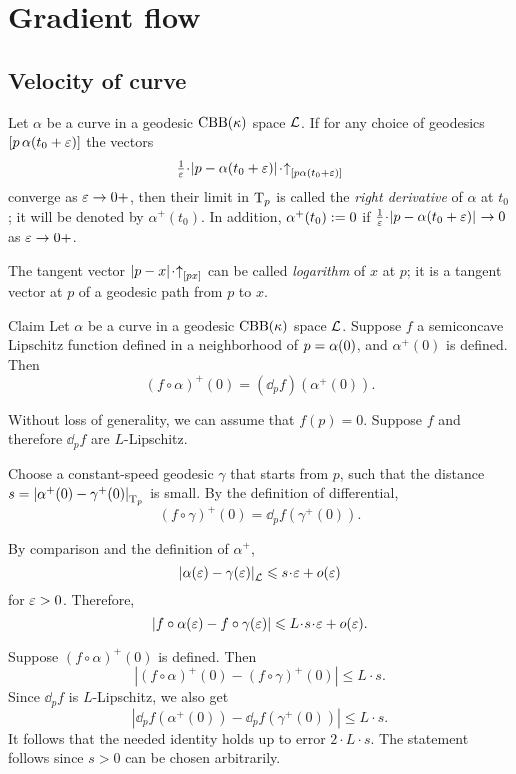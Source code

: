 \chapter{Gradient flow}\label{chap:GF}

\section{Velocity of curve}

Let $\alpha$ be a curve in a geodesic $\mathrm{CBB}(\kappa)$ space $\mathcal{L}$.
If for any choice of 
geodesics $[p\,\alpha(t_0+\varepsilon)]$ the vectors 
\[\tfrac{1}{\eps}\cdot\dist{p}{\alpha(t_0+\eps)}{}\cdot\dir p{\alpha(t_0+\eps)}\]
converge as $\varepsilon\to 0+$, then their limit in $\mathrm{T}_p$ is called the \emph{right derivative} of $\alpha$ at $t_0$; it will be denoted by $\alpha^+(t_0)$.
In addition, $\alpha^+(t_0)\mathrel{:=}0$
if $\tfrac{1}{\eps}\cdot\dist{p}{\alpha(t_0+\eps)}{}\to 0$ as $\varepsilon\to 0+$.

The tangent vector $\dist px{}\cdot\dir px$ can be called \emph{logarithm} of $x$ at $p$;
it is a tangent vector at $p$ of a geodesic path from $p$ to $x$.


\begin{thm}{Claim}\label{clm:fa'=dfa'}
Let $\alpha$ be a curve in a geodesic $\mathrm{CBB}(\kappa)$ space $\mathcal{L}$.
Suppose $f$ a semiconcave Lipschitz function
defined in a neighborhood of $p\z=\alpha(0)$,
and $\alpha^+(0)$ is defined.
Then 
\[(f\circ\alpha)^+(0)
=
(\dd_pf)(\alpha^+(0)).\]
\end{thm}

Without loss of generality, we can assume that $f(p)=0$.
Suppose $f$ and therefore $\dd_pf$ are $L$-Lipschitz.

Choose a constant-speed geodesic $\gamma$ that starts from $p$,
such that the distance
$s=\dist{\alpha^+(0)}{\gamma^+(0)}{\T_p}$
is small.
By the definition of differential,
\[(f\circ\gamma)^+(0)=\dd_pf(\gamma^+(0)).\]

By comparison and the definition of $\alpha^+$,
\[\dist{\alpha(\eps)}{\gamma(\eps)}{\spc{L}}\le s\cdot\eps+o(\eps)\]
for $\varepsilon>0$.
Therefore,
\[|f\circ\alpha(\eps)-f\circ\gamma(\eps)|\le L\cdot s\cdot\eps+o(\eps).\]

Suppose $(f\circ\alpha)^+(0)$ is defined.
Then
\[|(f\circ\alpha)^+(0)-(f\circ\gamma)^+(0)|\le L\cdot s.\]
Since $\dd_pf$ is $L$-Lipschitz, we also get 
\[|\dd_pf(\alpha^+(0))-\dd_pf(\gamma^+(0))|\le L\cdot s.\]
It follows that the needed identity holds up to error $2\cdot L\cdot s$.
The statement follows since $s>0$ can be chosen arbitrarily.

